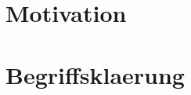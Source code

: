 \documentclass[a4paper, ngerman]{scrreprt}
\begin{document}


\tableofcontents

\chapter{Motivation}


\chapter{Begriffsklaerung}

\end{document}
